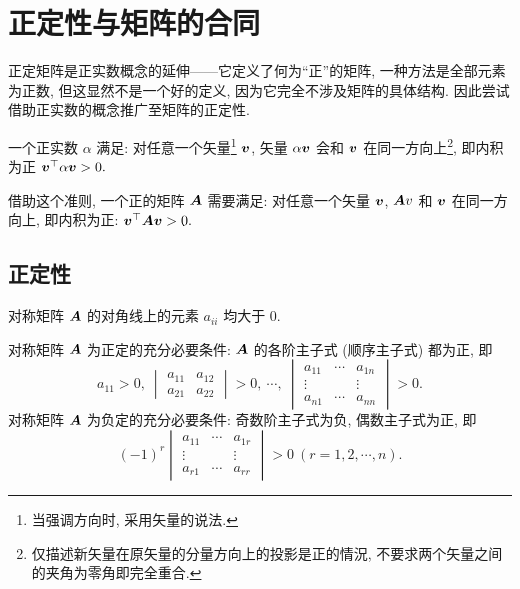 \section{正定性与矩阵的合同}

正定矩阵是正实数概念的延伸——它定义了何为“正”的矩阵, 一种方法是全部元素为正数, 但这显然不是一个好的定义,
因为它完全不涉及矩阵的具体结构. 因此尝试借助正实数的概念推广至矩阵的正定性.

一个正实数 $\alpha$ 满足: 对任意一个矢量\footnote{当强调方向时, 采用矢量的说法.} $\vb*{v}$, 矢量 $\alpha\vb*{v}$ 会和 $\vb*{v}$ 在同一方向上\footnote{仅描述新矢量在原矢量的分量方向上的投影是正的情況, 不要求两个矢量之间的夹角为零角即完全重合.}, 即内积为正 $\vb*{v}^\top\alpha\vb*{v}>0.$

借助这个准则, 一个正的矩阵 $\vb*{A}$ 需要满足: 对任意一个矢量 $\vb*{v}$, $\vb*{A}v$ 和 $\vb*{v}$ 在同一方向上, 即内积为正: $\vb*{v}^\top\vb*{A}\vb*{v}>0.$

\subsection{正定性}

\begin{theorem}[正定的必要条件]
    对称矩阵 $\vb*{A}$ 的对角线上的元素 $a_{ii}$ 均大于 0.
    \label{zddbytj}
\end{theorem}

\begin{theorem}[Hurwitz 定理]
    对称矩阵 $\vb*{A}$ 为正定的充分必要条件: $\vb*{A}$ 的各阶主子式 (顺序主子式) 都为正, 即
    $$a_{11}>0,~\begin{vmatrix}
            a_{11} & a_{12} \\
            a_{21} & a_{22}
        \end{vmatrix}>0,~\cdots,~\begin{vmatrix}
            a_{11} & \cdots & a_{1n}  \\
            \vdots &        & \vdots\ \\
            a_{n1} & \cdots & a_{nn}
        \end{vmatrix}>0.$$
    对称矩阵 $\vb*{A}$  为负定的充分必要条件: 奇数阶主子式为负, 偶数主子式为正, 即
    $$(-1)^r\begin{vmatrix}
            a_{11} & \cdots & a_{1r} \\
            \vdots &        & \vdots \\
            a_{r1} & \cdots & a_{rr}
        \end{vmatrix}>0~  (r=1,2,\cdots ,n).$$
    \label{Hurwitztheorem}
\end{theorem}

